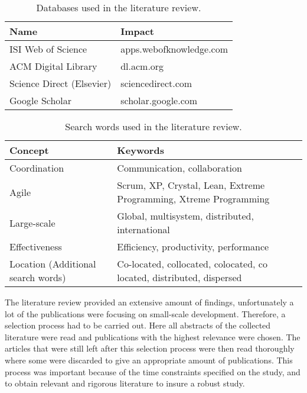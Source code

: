 \begin{table}[H]
\begin{center}
    \begin{tabular}{ | p{5cm} | p{8cm} |}
    \hline
    \textbf{Name} & \textbf{Impact} \\ \hline
    ISI Web of Science & apps.webofknowledge.com \\ \hline
    ACM Digital Library & dl.acm.org  \\ \hline
    Science Direct (Elsevier) & sciencedirect.com \\ \hline
    Google Scholar & scholar.google.com \\ \hline
    \end{tabular}
    \caption{Databases used in the literature review.}
    \label{databases}
\end{center}
\end{table}

\begin{table}[H]
\begin{center}
    \begin{tabular}{ | p{5cm} | p{8cm} |}
    \hline
    \textbf{Concept} & \textbf{Keywords} \\ \hline
    Coordination & Communication, collaboration \\ \hline
    Agile & Scrum, XP, Crystal, Lean, Extreme Programming, Xtreme Programming  \\ \hline
    Large-scale & Global, multisystem, distributed, international \\ \hline
    Effectiveness & Efficiency, productivity, performance \\ \hline
    Location (Additional search words) & Co-located, collocated, colocated, co located, distributed, dispersed  \\ \hline
    \end{tabular}
    \caption{Search words used in the literature review.}
    \label{searchwords}
\end{center}
\end{table}

The literature review provided an extensive amount of findings, unfortunately a lot of the publications were focusing on small-scale development. Therefore, a selection process had to be carried out. Here all abstracts of the collected literature were read and publications with the highest relevance were chosen. The articles that were still left after this selection process were then read thoroughly where some were discarded to give an appropriate amount of publications. This process was important because of the time constraints specified on the study, and to obtain relevant and rigorous literature to insure a robust study.
